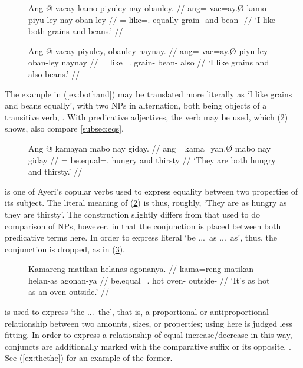 \begin{figure}[h]
\pex
\a\label{ex:bothand}\begingl
	\gla Ang @ vacay kamo piyuley nay obanley. //
	\glb ang= vac=ay.Ø kamo piyu-ley nay oban-ley //
	\glc \AgtT{}= like=\Fsg{}.\Top{} equally grain-\PargI{} and
		bean-\PargI{} //
	\glft `I like both grains and beans.' //
\endgl

\a\label{ex:andaswell}\begingl
	\gla Ang @ vacay piyuley, obanley naynay. //
	\glb ang= vac=ay.Ø piyu-ley oban-ley naynay //
	\glc \AgtT{}= like=\Fsg{}.\Top{} grain-\PargI{} bean-\PargI{} also //
	\glft `I like grains and also beans.' //
\endgl
\xe
\end{figure}

The example in (\ref{ex:bothand}) may be translated more literally as `I like
grains and beans equally', with two NPs in alternation, both being objects of a
transitive verb, . With predicative adjectives, the
verb  may be used, which (\ref{ex:bothandpred})
shows, also compare \autoref{subsec:eqs}.

\begin{figure}[h]
\ex\label{ex:bothandpred}
\begingl
	\gla Ang @ kamayan mabo nay giday. //
	\glb ang= kama=yan.Ø mabo nay giday //
	\glc \AgtT{}= be.equal=\TplM{}.\Top{} hungry and thirsty //
	\glft `They are both hungry and thirsty.' //
\endgl
\xe
\end{figure}

 is one of Ayeri's copular verbs used to express equality 
between two properties of its subject. The literal meaning of
(\ref{ex:bothandpred}) is thus, roughly, `They are as hungry as they are
thirsty'. The construction slightly differs from that used to do comparison of
NPs, however, in that the conjunction  is placed between both
predicative terms here. In order to express literal `be ...\ as ...\ as', thus,
the conjunction is dropped, as in (\ref{ex:asas}).

\begin{figure}[h]
\ex\label{ex:asas}
\begingl
	\gla Kamareng matikan helanas agonanya. //
	\glb kama=reng matikan helan-as agonan-ya //
	\glc be.equal=\TsgI{}.\Aarg{} hot oven-\Parg{} outside-\Loc{} //
	\glft `It's as hot as an oven outside.' //
\endgl
\xe
\end{figure}


 is used to express `the ...\ the', that is, a 
proportional or antiproportional relationship between two amounts, sizes, 
or properties; using  here is judged less fitting. In 
order to express a relationship of equal increase/decrease in this way, 
conjuncts are additionally marked with the comparative suffix 
 or its opposite, . See
(\ref{ex:thethe}) for an example of the former.

